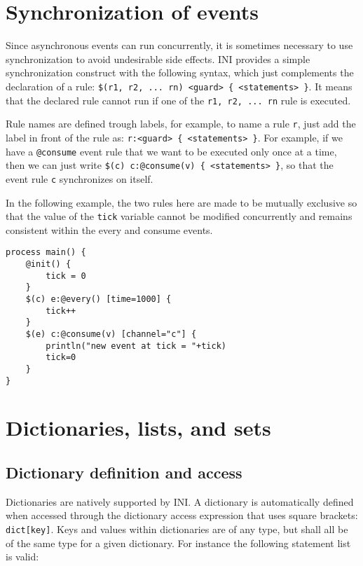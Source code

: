 \documentclass[11pt]{report}
\begin{document}
\section{Synchronization of events}

Since asynchronous events can run concurrently, it is sometimes necessary to use synchronization to avoid undesirable side effects. INI provides a simple synchronization construct with the following syntax, which just complements the declaration of a rule: \texttt{\$(r1, r2, ... rn) <guard> \{ <statements> \}}. It means that the declared rule cannot run if one of the \texttt{r1, r2, ... rn} rule is executed.

Rule names are defined trough labels, for example, to name a rule \texttt{r}, just add the label in front of the rule as: \texttt{r:<guard> \{ <statements> \}}. For example, if we have a \texttt{@consume} event rule that we want to be executed only once at a time, then we can just write  \texttt{\$(c) c:@consume(v) \{ <statements> \}}, so that the event rule \texttt{c} synchronizes on itself.

In the following example, the two rules here are made to be mutually exclusive so that the value of the \texttt{tick} variable cannot be modified concurrently and remains consistent within the every and consume events.

\begin{lstlisting}[numbers=none]
process main() {
	@init() {
		tick = 0
	}
	$(c) e:@every() [time=1000] {
		tick++
	}
	$(e) c:@consume(v) [channel="c"] {
		println("new event at tick = "+tick)
		tick=0
	}
}
\end{lstlisting}

\section{Dictionaries, lists, and sets}

\subsection{Dictionary definition and access}

Dictionaries are natively supported by INI. A dictionary is automatically defined when accessed through the dictionary access expression that uses square brackets: \texttt{dict[key]}. Keys and values within dictionaries are of any type, but shall all be of the same type for a given dictionary. For instance the following statement list is valid:
\end{document}
